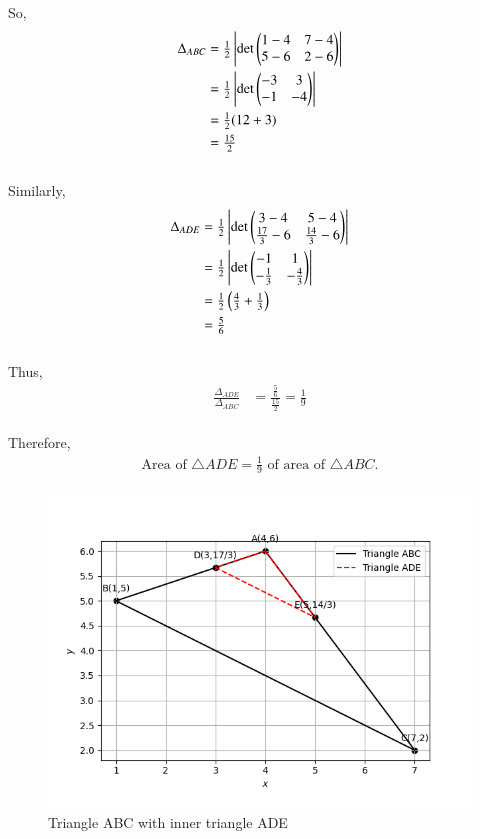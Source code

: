 \documentclass[journal]{IEEEtran}
\begin{document}
\newpage
So,
\begin{align*}
    \Delta_{ABC} &= \tfrac{1}{2}\left|\det \begin{pmatrix}1-4 & 7-4 \\ 5-6 & 2-6\end{pmatrix}\right| \\
                 &= \tfrac{1}{2}\left|\det \begin{pmatrix}-3 & 3 \\ -1 & -4\end{pmatrix}\right| \\
                 &= \tfrac{1}{2}(12+3) \\
                 &= \tfrac{15}{2}
\end{align*} \\

Similarly,
\begin{align*}
    \Delta_{ADE} &= \tfrac{1}{2}\left|\det \begin{pmatrix}3-4 & 5-4 \\ \tfrac{17}{3}-6 & \tfrac{14}{3}-6\end{pmatrix}\right| \\
                 &= \tfrac{1}{2}\left|\det \begin{pmatrix}-1 & 1 \\ -\tfrac{1}{3} & -\tfrac{4}{3}\end{pmatrix}\right| \\
                 &= \tfrac{1}{2}\left(\tfrac{4}{3}+\tfrac{1}{3}\right) \\
                 &= \tfrac{5}{6}
\end{align*} \\

Thus,
\begin{align*}
    \frac{\Delta_{ADE}}{\Delta_{ABC}}
    &= \frac{\tfrac{5}{6}}{\tfrac{15}{2}}
     = \frac{1}{9}
\end{align*} \\

Therefore,
\begin{align*}
    \text{Area of } \triangle ADE = \tfrac{1}{9} \text{ of area of } \triangle ABC.
\end{align*}

\newpage
\begin{figure}[H]
    \centering
    \includegraphics[width=0.6\linewidth]{figs/fig4.png}
    \caption{Triangle ABC with inner triangle ADE}
    \label{fig:1}
\end{figure}
\end{document}
